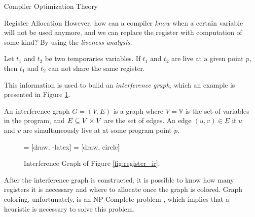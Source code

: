 \begin{section}{Compiler Optimization Theory}
\begin{subsection}{Register Allocation}
	However, how can a compiler \textit{know} when a certain variable will not
	be used anymore, and we can replace the register with computation of some
	kind? By using the \textit{liveness analysis}.

\begin{definition}
	Let $t_1$ and $t_2$ be two temporaries variables. If $t_1$ and
	$t_2$ are live at a given point $p$, then $t_1$ and $t_2$ can not
	share the same register.
\end{definition}

This information is used to build an \textit{interference graph}, which an
example is presented in Figure \ref{fig:interf_graph}.

\begin{definition}
	An interference graph $G = (V, E)$ is a graph where $V = \mathbb{V}$ is the
	set of variables in the program, and $E \subseteq V \times V$ are the set of
	edges. An edge $(u, v) \in E$ if $u$ and $v$ are simultaneously live at
	at some program point $p$.
\end{definition}

\begin{figure}
     = [draw, -latex]
     = [draw, circle]
    \begin{center}
    \end{center}
	  \caption{Interference Graph of Figure \ref{fig:register_ir}.}
	  \label{fig:interf_graph}
\end{figure}

After the interference graph is constructed, it is possible to know how many
registers it is necessary and where to allocate once the graph is colored.
Graph coloring, unfortunately, is an NP-Complete problem
\citep{karp1972reducibility}, which implies that a heuristic is necessary to
solve this problem.


\end{subsection}
\end{section}
